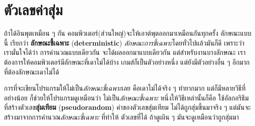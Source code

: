 \section{ตัวเลขค่าสุ่ม}



ถ้าได้อินพุตเหมือน ๆ กัน
คอมพิวเตอร์(ส่วนใหญ่)จะให้เอาต์พุตออกมาเหมือนกันทุกครั้ง
ลักษณะแบบนี้ เรียกว่า \textbf{ลักษณะชี้เฉพาะ} (\textbf{deterministic})
\textit{ลักษณะการชี้เฉพาะ}โดยทั่วไปแล้วมันก็ดี
เพราะว่า เรามั่นใจได้ว่า การคำนวณแบบเดียวกัน จะได้ผลออกมาแบบเดียวกัน
แต่สำหรับงานบางลักษณะ
เราต้องการให้คอมพิวเตอร์มีลักษณะที่เดาไม่ได้บ้าง
เกมส์ก็เป็นตัวอย่างหนึ่ง แต่ยังมีตัวอย่างอื่น ๆ อีกมาก ที่ต้องลักษณะเดาไม่ได้


การที่จะเขียนโปรแกรมให้ไม่เป็น\textit{ลักษณะชี้เฉพาะ}เลย คือเดาไม่ได้จริง ๆ ทำยากมาก
แต่ก็มีหลายวิธีที่ อย่างน้อย ก็ช่วยให้โปรแกรมดูเหมือนว่า ไม่เป็น\textit{ลักษณะชี้เฉพาะ}
หนึ่งให้วิธีเหล่านั้นก็คือ ใช้อัลกอริธึมที่สร้างตัวเลข\textbf{สุ่มเทียม} (\textbf{pseudorandom})
ค่าของตัวเลขสุ่มเทียม ไม่ได้ถูกสุ่มขึ้นมาจริง ๆ
แต่มันจะสร้างมาจากการคำนวณ\textit{ลักษณะชี้เฉพาะ}
ที่ทำให้ ตัวเลขที่ได้ ถ้าดูเผิน ๆ มันจะดูเหมือนว่าถูกสุ่มมา



